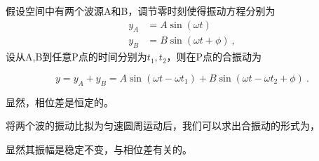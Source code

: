 假设空间中有两个波源A和B，调节零时刻使得振动方程分别为
\begin{equation}
\begin{aligned}
y_A&=A\sin(\omega t)\\
y_B&=B\sin (\omega t+\phi)~,
\end{aligned}
\end{equation}
设从A,B到任意P点的时间分别为$t_1,t_2$，则在P点的合振动为

\begin{equation}
y=y_A+y_B=A\sin(\omega t-\omega t_1)+B\sin(\omega t-\omega t_2+\phi)~.
\end{equation}

显然，相位差是恒定的。

将两个波的振动比拟为匀速圆周运动后，我们可以求出合振动的形式为，

显然其振幅是稳定不变，与相位差有关的。
